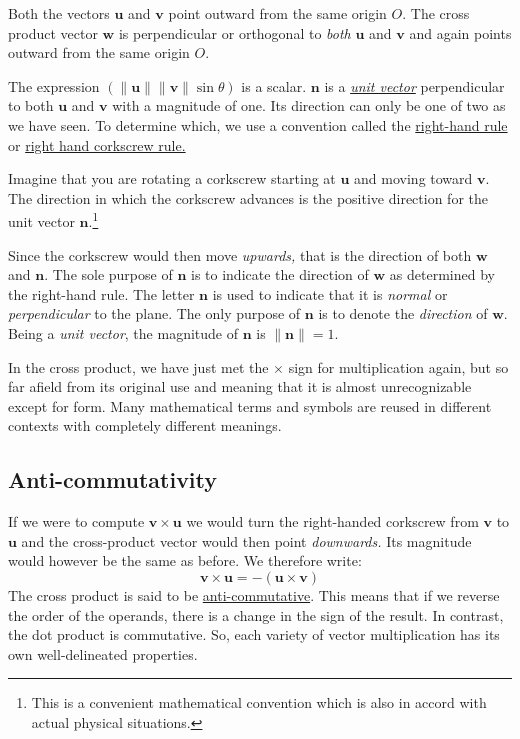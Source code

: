 \documentclass[
  a4paper,
]{article}
\begin{document}
Both the vectors \(\symbf{u}\) and \(\symbf{v}\) point outward from the
same origin \(O\). The cross product vector \(\symbf{w}\) is
perpendicular or orthogonal to \emph{both} \(\symbf{u}\) and
\(\symbf{v}\) and again points outward from the same origin \(O\).

The expression
\((\lVert\symbf{u}\rVert \lVert\symbf{v}\rVert \sin \theta)\) is a
scalar. \(\symbf{n}\) is a
\href{http://mathworld.wolfram.com/UnitVector.html}{\emph{unit vector}}
perpendicular to both \(\symbf{u}\) and \(\symbf{v}\) with a magnitude
of one. Its direction can only be one of two as we have seen. To
determine which, we use a convention called the
\href{http://mathworld.wolfram.com/Right-HandRule.html}{right-hand rule}
or \href{http://en.wikipedia.org/wiki/Right-hand_rule}{right hand
corkscrew rule.}

Imagine that you are rotating a corkscrew starting at \(\symbf{u}\) and
moving toward \(\symbf{v}\). The direction in which the corkscrew
advances is the positive direction for the unit vector
\(\symbf{n}\).\footnote{This is a convenient mathematical convention
  which is also in accord with actual physical situations.}

Since the corkscrew would then move \emph{upwards,} that is the
direction of both \(\symbf{w}\) and \(\symbf{n}\). The sole purpose of
\(\symbf{n}\) is to indicate the direction of \(\symbf{w}\) as
determined by the right-hand rule. The letter \(\symbf{n}\) is used to
indicate that it is \emph{normal} or \emph{perpendicular} to the plane.
The only purpose of \(\symbf{n}\) is to denote the \emph{direction} of
\(\symbf{w}\). Being a \emph{unit vector}, the magnitude of
\(\symbf{n}\) is \(\lVert\symbf n\rVert = 1\).

In the cross product, we have just met the \(\times\) sign for
multiplication again, but so far afield from its original use and
meaning that it is almost unrecognizable except for form. Many
mathematical terms and symbols are reused in different contexts with
completely different meanings.

\hypertarget{anti-commutativity}{%
\subsection{Anti-commutativity}\label{anti-commutativity}}

If we were to compute \(\symbf{v} \times \symbf{u}\) we would turn the
right-handed corkscrew from \(\symbf{v}\) to \(\symbf{u}\) and the
cross-product vector would then point \emph{downwards.} Its magnitude
would however be the same as before. We therefore write: \[
\symbf{v} \times \symbf{u} = - (\symbf{u} \times \symbf{v})
\] The cross product is said to be
\href{https://mathworld.wolfram.com/Anticommutative.html}{anti-commutative}.
This means that if we reverse the order of the operands, there is a
change in the sign of the result. In contrast, the dot product is
commutative. So, each variety of vector multiplication has its own
well-delineated properties.
\end{document}
